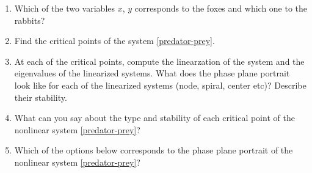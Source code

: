\documentclass[11pt]{article}
\begin{document}
\begin{enumerate}
	\item Which of the two variables $x$, $y$ corresponds to the foxes and which one to the rabbits?
	\item Find the critical points of the system \eqref{predator-prey}.
	\item At each of the critical points, compute the linearzation of the system and the eigenvalues of the linearized systems. 
	What does the phase plane portrait look like for each of the linearized systems (node, spiral, center etc)? Describe their stability.
	\item What can you say about the type and stability of each critical point of the nonlinear system \eqref{predator-prey}?
	\item \label{4} Which of the options below corresponds to the phase plane portrait of the nonlinear system \eqref{predator-prey}?


\end{enumerate}
\end{document}
